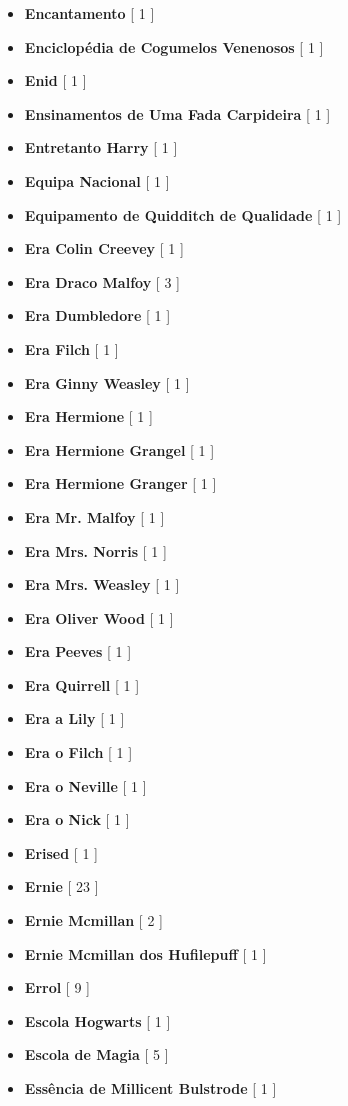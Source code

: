 \documentclass[a4paper]{article}
\begin{document}
\begin{itemize}
	\item \textbf{Encantamento} [ 1 ]
	\item \textbf{Enciclopédia de Cogumelos Venenosos} [ 1 ]
	\item \textbf{Enid} [ 1 ]
	\item \textbf{Ensinamentos de Uma Fada Carpideira} [ 1 ]
	\item \textbf{Entretanto Harry} [ 1 ]
	\item \textbf{Equipa Nacional} [ 1 ]
	\item \textbf{Equipamento de Quidditch de Qualidade} [ 1 ]
	\item \textbf{Era Colin Creevey} [ 1 ]
	\item \textbf{Era Draco Malfoy} [ 3 ]
	\item \textbf{Era Dumbledore} [ 1 ]
	\item \textbf{Era Filch} [ 1 ]
	\item \textbf{Era Ginny Weasley} [ 1 ]
	\item \textbf{Era Hermione} [ 1 ]
	\item \textbf{Era Hermione Grangel} [ 1 ]
	\item \textbf{Era Hermione Granger} [ 1 ]
	\item \textbf{Era Mr. Malfoy} [ 1 ]
	\item \textbf{Era Mrs. Norris} [ 1 ]
	\item \textbf{Era Mrs. Weasley} [ 1 ]
	\item \textbf{Era Oliver Wood} [ 1 ]
	\item \textbf{Era Peeves} [ 1 ]
	\item \textbf{Era Quirrell} [ 1 ]
	\item \textbf{Era a Lily} [ 1 ]
	\item \textbf{Era o Filch} [ 1 ]
	\item \textbf{Era o Neville} [ 1 ]
	\item \textbf{Era o Nick} [ 1 ]
	\item \textbf{Erised} [ 1 ]
	\item \textbf{Ernie} [ 23 ]
	\item \textbf{Ernie Mcmillan} [ 2 ]
	\item \textbf{Ernie Mcmillan dos Hufilepuff} [ 1 ]
	\item \textbf{Errol} [ 9 ]
	\item \textbf{Escola Hogwarts} [ 1 ]
	\item \textbf{Escola de Magia} [ 5 ]
	\item \textbf{Essência de Millicent Bulstrode} [ 1 ]

\end{itemize}
\end{document}
